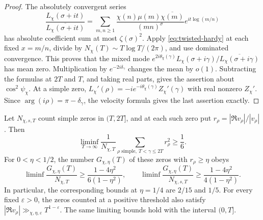 \begin{proof}
The absolutely convergent series
\[
 \frac{L_\chi(\sigma+it)}{\overline{L_\chi(\sigma+it)}}
 =\sum_{m,n\ge1}\frac{\chi(n)\mu(m)\overline{\chi(m)}}{(mn)^\sigma}
                e^{it\log(m/n)}
\]
has absolute coefficient sum at most $\zeta(\sigma)^2$.
Apply \eqref{eq:twisted-hardy} at each fixed $x=m/n$, divide by
$N_\chi(T)\sim T\log T/(2\pi)$, and use dominated convergence.
This proves that the mixed mode
$e^{2i\theta_\chi(\gamma)}L_\chi(\sigma+i\gamma)/
\overline{L_\chi(\sigma+i\gamma)}$ has mean zero. Multiplication
by $e^{-2i\delta_\gamma}$ changes the mean by $o(1)$.
Subtracting the formulas at $2T$ and $T$, and taking real parts,
gives the assertion about $\cos^2\psi_\chi$.
At a simple zero,
$L_\chi'(\rho)=-ie^{-i\theta_\chi(\gamma)}Z_\chi'(\gamma)$
with real nonzero $Z_\chi'$. Since $\arg(i\rho)=\pi-\delta_\gamma$,
the velocity formula gives the last assertion exactly.
\end{proof}

\begin{corollary}
\label{cor:unsigned-transversality}
Let $N_{\chi,s,T}$ count simple zeros in $(T,2T]$, and at
each such zero put $r_\rho=|\Re v_\rho|/|v_\rho|$.
Then
\[
 \liminf_{T\to\infty}\frac1{N_{\chi,T}}
       \sum_{\rho\text{ simple},\ T<\gamma\le2T}r_\rho^2
       \ge\frac16.
\]
For $0<\eta<1/2$, the number $G_{\chi,\eta}(T)$ of these
zeros with $r_\rho\ge\eta$ obeys
\[
 \liminf\frac{G_{\chi,\eta}(T)}{N_{\chi,T}}
 \ge\frac{1-4\eta^2}{6(1-\eta^2)},\qquad
 \liminf\frac{G_{\chi,\eta}(T)}{N_{\chi,s,T}}
 \ge\frac{1-4\eta^2}{4(1-\eta^2)}.
\]
In particular, the corresponding bounds at $\eta=1/4$ are
$2/15$ and $1/5$. For every fixed $\varepsilon>0$, the zeros
counted at a positive threshold also satisfy
$|\Re v_\rho|\gg_{\chi,\eta,\varepsilon}T^{1-\varepsilon}$.
The same limiting bounds hold with the interval $(0,T]$.
\end{corollary}

